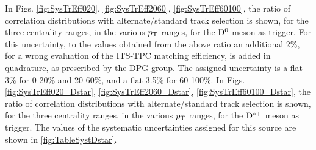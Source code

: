 In Figs. \ref{fig:SysTrEff020}, \ref{fig:SysTrEff2060}, \ref{fig:SysTrEff60100}, the ratio of correlation distributions with alternate/standard track selection is shown, for the three centrality ranges, in the various $p_{\rm T}$ ranges, for the ${\rm D^0}$ meson as trigger.
For this uncertainty, to the values obtained from the above ratio an additional 2\%, for a wrong evaluation of the ITS-TPC matching efficiency, is added in quadrature, as prescribed by the DPG group.
The assigned uncertainty is a flat 3\% for 0-20\% and 20-60\%, and a flat 3.5\% for 60-100\%.
In Figs. \ref{fig:SysTrEff020_Dstar}, \ref{fig:SysTrEff2060_Dstar}, \ref{fig:SysTrEff60100_Dstar}, the ratio of correlation distributions with alternate/standard track selection is shown, for the three centrality ranges, in the various $p_{\rm T}$ ranges, for the ${\rm D^{*+}}$ meson as trigger. The values of the systematic uncertainties assigned for this source are shown in \ref{fig:TableSystDstar}.

